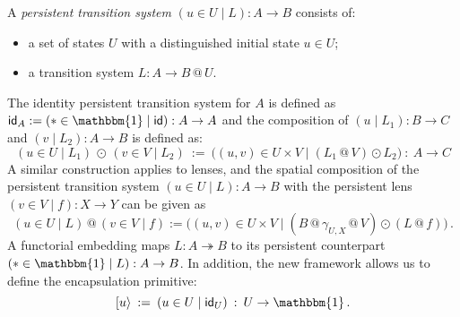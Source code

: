 \documentclass[acmsmall,screen,review,anonymous,nonacm]{acmart}
\newcommand{\kw}[1]{\ensuremath{ \mathsf{#1} }}
\newcommand{\intl}[1]{#1^0}
\begin{document}
\begin{definition} \label{def:slts} %
A \emph{persistent transition system}
$(u \in U \mid L) : A \rightarrow B$
consists of:
\begin{itemize}
  \item a set of states $U$ with a distinguished initial state $u \in U$;
  \item a transition system $L : A \rightarrow B \mathbin@ U$.
\end{itemize}
The identity persistent transition system for $A$ is defined as
$\kw{id}_A := (* \in \mathbbm{1} \mid \kw{id}) : A \rightarrow A$
and the composition of
$(u \mid L_1) : B \rightarrow C$ and
$(v \mid L_2) : A \rightarrow B$ is defined as:
\[
  (u \in U \mid L_1) \,\odot\, (v \in V \mid L_2) \::=\:
  \big( (u, v) \in U \times V \mid
        (L_1 \mathbin@ V) \odot L_2 \big)
  \::\: A \rightarrow C
\]
A similar construction applies to lenses,
and the spatial composition of the persistent transition system
$(u \in U \mid L) : A \rightarrow B$
with the persistent lens
$(v \in V \mid f) : X \rightarrow Y$
can be given as
\[
  (u \in U \mid L) \mathbin@ (v \in V \mid f) :=
  \big( (u, v) \in U \times V \mid
    (B \mathbin@ \gamma_{U,X} \mathbin@ V) \odot
    (L \mathbin@ f) \big)
  \,.
\]
A functorial embedding
maps $L : A \twoheadrightarrow B$
to its persistent counterpart $(* \in \mathbbm{1} \mid L) : A \rightarrow B$.
In addition,
the new framework allows us to define the encapsulation primitive:
\[
  [ u \rangle \: := \:  (u \in U \mid \kw{id}_U)
  \: : \: U \rightarrow \mathbbm{1}
  \,.
\]
\end{definition}


%
\end{document}
